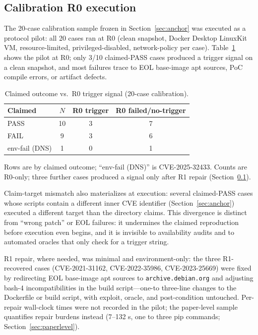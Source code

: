 \documentclass[11pt]{article}
\begin{document}
\subsection{Calibration R0 execution}
\label{sec:calib-r0}
The 20-case calibration sample frozen in Section~\ref{sec:anchor} was executed as a protocol pilot: all 20 cases ran at R0 (clean snapshot, Docker Desktop LinuxKit VM, resource-limited, privileged-disabled, network-policy per case). Table~\ref{tab:calibration} shows the pilot at R0; only 3/10 claimed-PASS cases produced a trigger signal on a clean snapshot, and most failures trace to EOL base-image apt sources, PoC compile errors, or artifact defects.
\begin{table}[h]
\centering
\caption{Claimed outcome vs.\ R0 trigger signal (20-case calibration).}
\label{tab:calibration}
\begin{tabular}{@{}lccc@{}}
\toprule
Claimed & $N$ & R0 trigger & R0 failed/no-trigger \\
\midrule
PASS & 10 & 3 & 7 \\
FAIL & 9 & 3 & 6 \\
env-fail (DNS) & 1 & 0 & 1 \\
\bottomrule
\end{tabular}

\smallskip
\noindent\footnotesize Rows are by claimed outcome; ``env-fail (DNS)'' is
CVE-2025-32433. Counts are R0-only; three further cases produced a signal
only after R1 repair (Section~\ref{sec:calib-r0}).
\normalsize
\end{table}

Claim-target mismatch also materializes at execution: several claimed-PASS cases whose scripts contain a different inner CVE identifier (Section~\ref{sec:anchor}) executed a different target than the directory claims. This divergence is distinct from ``wrong patch'' or EOL failures: it undermines the claimed reproduction before execution even begins, and it is invisible to availability audits and to automated oracles that only check for a trigger string.

R1 repair, where needed, was minimal and environment-only: the three R1-recovered cases (CVE-2021-31162, CVE-2022-35986, CVE-2023-25669) were fixed by redirecting EOL base-image apt sources to \texttt{archive.debian.org} and adjusting bash-4 incompatibilities in the build script---one-to three-line changes to the Dockerfile or build script, with exploit, oracle, and post-condition untouched. Per-repair wall-clock times were not recorded in the pilot; the paper-level sample quantifies repair burdens instead (7--132 s, one to three pip commands; Section~\ref{sec:paperlevel}).
\end{document}
